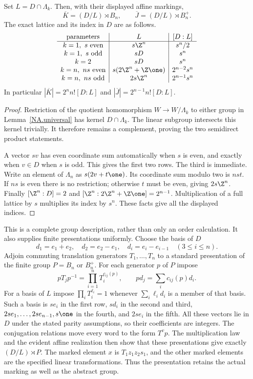 \begin{theorem}\label{NA.lattice}
Set $L=D\cap\Lambda_k$. Then, with their displayed affine markings,
\[
 \overline K=(D/L)\rtimes B_n,\qquad
 \overline J=(D/L)\rtimes B_n^+.
\]
The exact lattice and its index in $D$ are as follows.
\[
\begin{array}{c|c|c}
\text{parameters}&L&[D:L]\\\hline
k=1,\ s\text{ even}&s\Z^n&s^n/2\\
k=1,\ s\text{ odd}&sD&s^n\\
k=2&sD&s^n\\
k=n,\ ns\text{ even}&s(2\Z^n+\Z\one)&2^{n-2}s^n\\
k=n,\ ns\text{ odd}&2s\Z^n&2^{n-1}s^n
\end{array}
\]
In particular $|\overline K|=2^nn![D:L]$ and
$|\overline J|=2^{n-1}n![D:L]$.
\end{theorem}
\begin{proof}
Restriction of the quotient homomorphism $W\to W/\Lambda_k$
to either group in Lemma~\ref{NA.universal} has kernel $D\cap\Lambda_k$.
The linear subgroup intersects this kernel trivially. It therefore
remains a complement, proving the two semidirect product statements.

A vector $sv$ has even coordinate sum automatically when $s$ is
even, and exactly when $v\in D$ when $s$ is odd. This gives
the first two rows. The third is immediate. Write an element of
$\Lambda_n$ as $s(2v+t\one)$. Its coordinate sum modulo two is
$nst$. If $ns$ is even there is no restriction; otherwise $t$
must be even, giving $2s\Z^n$.
Finally $[\Z^n:D]=2$ and
$[\Z^n:2\Z^n+\Z\one]=2^{n-1}$.
Multiplication of a full lattice by $s$ multiplies its index by
$s^n$. These facts give all the displayed indices.
\end{proof}

This is a complete group description, rather than only an order
calculation. It also supplies finite presentations uniformly.
Choose the basis of $D$
\[
 d_1=e_1+e_2,\quad d_2=e_2-e_1,\quad
 d_i=e_i-e_{i-1}\quad(3\le i\le n).
\]
Adjoin commuting translation generators $T_1,\ldots,T_n$ to a
standard presentation of the finite group $P=B_n$ or $B_n^+$.
For each generator $p$ of $P$ impose
\[
 pT_jp^{-1}=\prod_{i=1}^nT_i^{c_{ij}(p)},\qquad
 pd_j=\sum_i c_{ij}(p)d_i.
\]
For a basis of $L$ impose $\prod_iT_i^{\ell_i}=1$ whenever
$\sum_i\ell_i d_i$ is a member of that basis. Such a basis is
$se_i$ in the first row, $sd_i$ in the second and third,
$2se_1,\ldots,2se_{n-1},s\one$ in the fourth, and $2se_i$
in the fifth. All these vectors lie in $D$ under the stated
parity assumptions, so their coefficients are integers.
The conjugation relations move every word to the form $T^v p$.
The multiplication law and the evident affine realization then
show that these presentations give exactly $(D/L)\rtimes P$.
The marked element $x$ is $T_1z_1z_2s_1$, and the other marked
elements are the specified linear transformations. Thus the
presentation retains the actual marking as well as the abstract group.

